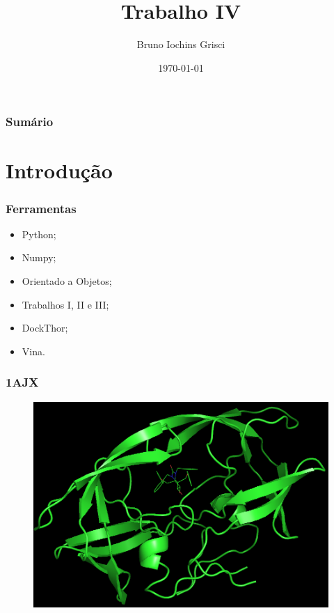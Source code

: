 \documentclass{beamer}
\title[T2]{Trabalho IV} %
\author{Bruno Iochins Grisci} %
\institute[UFRGS] %
{
Universidade Federal do Rio Grande do Sul \\ %
\medskip
\textit{bigrisci@inf.ufrgs.br} %
}
\date{\today} %
\begin{document}
\begin{frame}
\titlepage %
\end{frame}

\begin{frame}
\frametitle{Sumário} %
\tableofcontents %
\end{frame}


\section{Introdução} %

\begin{frame}
\frametitle{Ferramentas}
\begin{itemize}
\item Python;
\item Numpy;
\item Orientado a Objetos;
\item Trabalhos I, II e III;
\item DockThor;
\item Vina.
\end{itemize}
\end{frame}

\begin{frame}
\frametitle{1AJX}
\begin{figure}
\includegraphics[width=0.7\linewidth]{1AJX.png}
\end{figure}
\end{frame}
\end{document}
